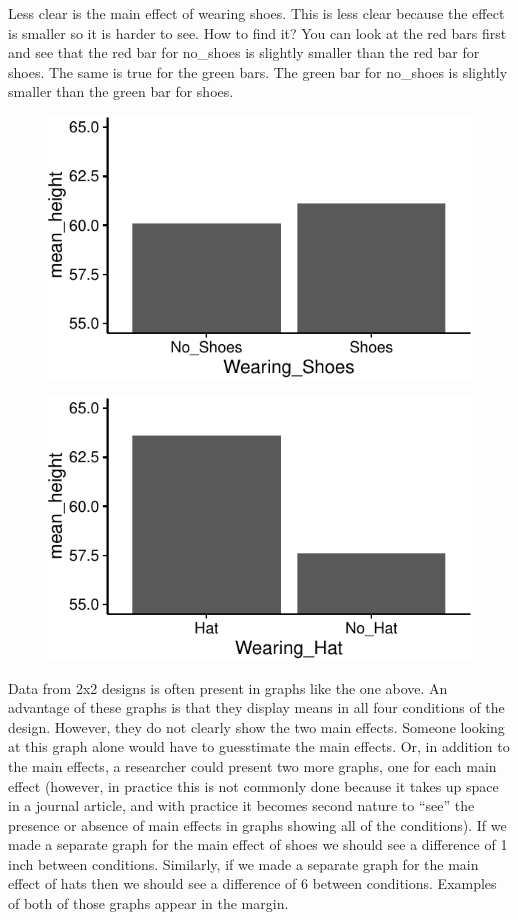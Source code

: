 Less clear is the main effect of wearing shoes. This is less clear
because the effect is smaller so it is harder to see. How to find it?
You can look at the red bars first and see that the red bar for
no\_shoes is slightly smaller than the red bar for shoes. The same is
true for the green bars. The green bar for no\_shoes is slightly smaller
than the green bar for shoes.

\begin{figure}
\includegraphics[width=.5\linewidth]{Factorial_files/figure-latex/unnamed-chunk-8-1} \end{figure}

\begin{figure}
\includegraphics[width=.5\linewidth]{Factorial_files/figure-latex/unnamed-chunk-8-2} \end{figure}

Data from 2x2 designs is often present in graphs like the one above. An
advantage of these graphs is that they display means in all four
conditions of the design. However, they do not clearly show the two main
effects. Someone looking at this graph alone would have to guesstimate
the main effects. Or, in addition to the main effects, a researcher
could present two more graphs, one for each main effect (however, in
practice this is not commonly done because it takes up space in a
journal article, and with practice it becomes second nature to ``see''
the presence or absence of main effects in graphs showing all of the
conditions). If we made a separate graph for the main effect of shoes we
should see a difference of 1 inch between conditions. Similarly, if we
made a separate graph for the main effect of hats then we should see a
difference of 6 between conditions. Examples of both of those graphs
appear in the margin.

